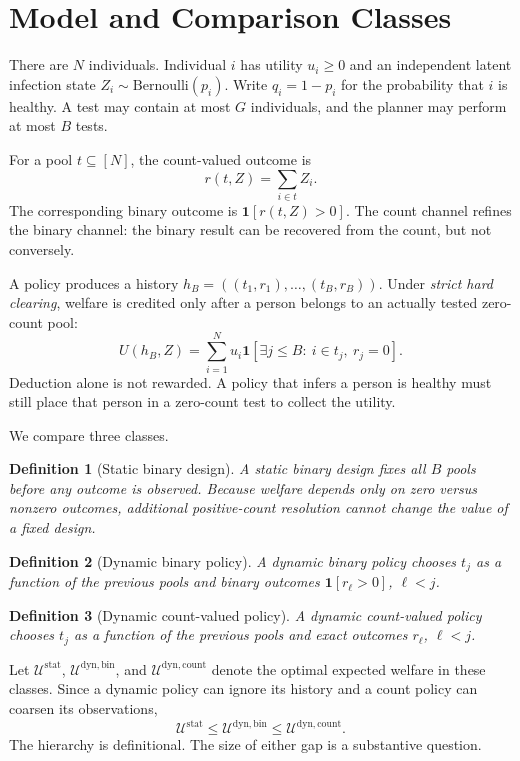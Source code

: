 \documentclass[11pt]{article}
\newtheorem{definition}{Definition}
\begin{document}
\section{Model and Comparison Classes}

There are $N$ individuals. Individual $i$ has utility $u_i\geq0$ and an
independent latent infection state $Z_i\sim\mathrm{Bernoulli}(p_i)$. Write
$q_i=1-p_i$ for the probability that $i$ is healthy. A test may contain at most
$G$ individuals, and the planner may perform at most $B$ tests.

For a pool $t\subseteq[N]$, the count-valued outcome is
\[
  r(t,Z)=\sum_{i\in t} Z_i.
\]
The corresponding binary outcome is $\mathbf{1}[r(t,Z)>0]$. The count channel
refines the binary channel: the binary result can be recovered from the count,
but not conversely.

A policy produces a history
$h_B=((t_1,r_1),\ldots,(t_B,r_B))$. Under \emph{strict hard clearing}, welfare is
credited only after a person belongs to an actually tested zero-count pool:
\[
  U(h_B,Z)=\sum_{i=1}^N u_i
  \mathbf{1}\!\left[\exists j\leq B:\ i\in t_j,\ r_j=0\right].
\]
Deduction alone is not rewarded. A policy that infers a person is healthy must
still place that person in a zero-count test to collect the utility.

We compare three classes.

\begin{definition}[Static binary design]
A static binary design fixes all $B$ pools before any outcome is observed.
Because welfare depends only on zero versus nonzero outcomes, additional
positive-count resolution cannot change the value of a fixed design.
\end{definition}

\begin{definition}[Dynamic binary policy]
A dynamic binary policy chooses $t_j$ as a function of the previous pools and
binary outcomes $\mathbf{1}[r_\ell>0]$, $\ell<j$.
\end{definition}

\begin{definition}[Dynamic count-valued policy]
A dynamic count-valued policy chooses $t_j$ as a function of the previous pools
and exact outcomes $r_\ell$, $\ell<j$.
\end{definition}

Let $\mathcal U^{\mathrm{stat}}$, $\mathcal U^{\mathrm{dyn,bin}}$, and
$\mathcal U^{\mathrm{dyn,count}}$ denote the optimal expected welfare in these
classes. Since a dynamic policy can ignore its history and a count policy can
coarsen its observations,
\[
  \mathcal U^{\mathrm{stat}}
  \leq \mathcal U^{\mathrm{dyn,bin}}
  \leq \mathcal U^{\mathrm{dyn,count}}.
\]
The hierarchy is definitional. The size of either gap is a substantive
question.
\end{document}
